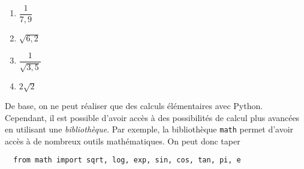 %
%
%
%
%


\begin{multicols}{4}
  \begin{enumerate}[label=\emph{\alph*)}]
    \item $\dfrac{1}{7,9}$
    \item $\sqrt{6,2}$
    \item $\dfrac{1}{\sqrt{3,5}}$
    \item $2\sqrt{2}$
  \end{enumerate}
\end{multicols}
De base, on ne peut réaliser que des calculs élémentaires avec Python. Cependant, il est possible d'avoir accès à des possibilités de calcul plus avancées en utilisant une \emph{bibliothèque}. 
Par exemple, la bibliothèque \texttt{math} permet d'avoir accès à de nombreux outils mathématiques. 
On peut donc taper
\begin{lstlisting}
  from math import sqrt, log, exp, sin, cos, tan, pi, e 
\end{lstlisting}

